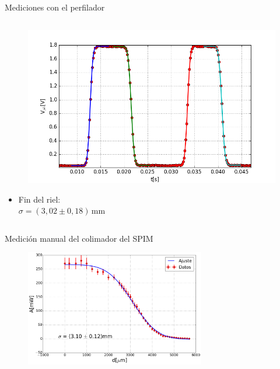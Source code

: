 \begin{frame}{Mediciones con el perfilador}
\begin{columns}[t]
            \begin{column}{0.5\textwidth}
                \vspace{-2em}
                \begin{figure}[H]
                    \centering
                    \includegraphics[width=\textwidth]{fig/perfilador/spim_foco_zoom.png}
                    \label{fig:spim_foco_zoom}
                \end{figure}
                \vspace{1em}
                \begin{itemize}
                    \item Fin del riel:\\ $\sigma = (3,02 \pm 0,18)\,\text{mm}$
                \end{itemize}
                
            \end{column}
            
        \end{columns}
        
\end{frame}
    
    \begin{frame}{Medición manual del colimador del SPIM}
            \begin{figure}[H]
                \centering
                \includegraphics[width=0.7\textwidth]{fig/perfilador/calibracion_f280.png}
                \label{fig:perfilador/calibracion_f280}
            \end{figure}
    \end{frame}


